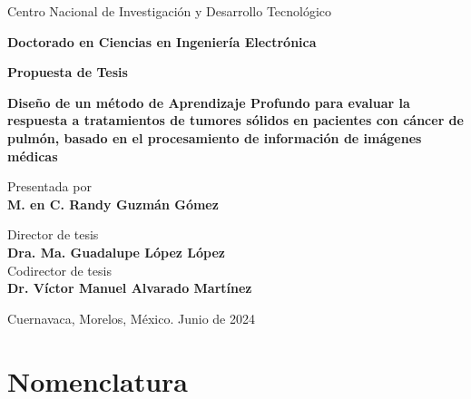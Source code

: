 \documentclass[11pt,a4paper,openany]{article}
\begin{document}
\begin{titlepage}
 	{\fontsize{24}{24} Centro Nacional de Investigación y Desarrollo Tecnológico}
 	\vspace{1.5cm}
    
{\fontsize{18}{18} \bf Doctorado en Ciencias en Ingeniería Electrónica}
        \vspace{1.5cm}

	
   {\fontsize{26}{26} \selectfont \bf Propuesta de Tesis}
 	\vspace{1cm}
 	
 	{\fontsize{14}{14}  \bf Diseño de un método de Aprendizaje Profundo para evaluar la respuesta a tratamientos de tumores sólidos en pacientes con cáncer de pulmón, basado en el procesamiento de información de imágenes médicas}
 	\vspace{2cm}
 	
 	
 	{\fontsize{18}{18}  Presentada por }\\
 	{\fontsize{15}{15} \bf M. en C. Randy Guzmán Gómez }
 	\vspace{2cm}
 	
 	{\fontsize{18}{18}  Director de tesis}\\
 	\vspace{0.2cm}
 	{\fontsize{15}{15} \bf Dra. Ma. Guadalupe López López }\\
 	\vspace{0.5cm}
 	{\fontsize{18}{18} Codirector de tesis}\\
 	\vspace{0.2cm}
 	{\fontsize{15}{15}\bf Dr. Víctor Manuel Alvarado Martínez}
 	\vspace{3cm}
	
 	{Cuernavaca, Morelos, México. Junio de 2024 \par}

\end{titlepage}
 	


\newpage

\tableofcontents 

\newpage

\listoffigures
\listoftables

\newpage


\section*{Nomenclatura}
\end{document}
